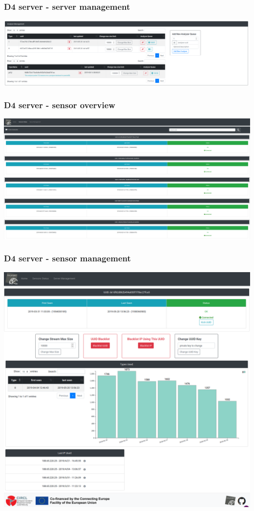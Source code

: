 \documentclass{beamer}
\begin{document}
\begin{frame}
        \frametitle{D4 server - server management}
        \includegraphics[width=\textwidth]{./d4-3.png}
\end{frame}

\begin{frame}
        \frametitle{D4 server - sensor overview}
        \includegraphics[width=\textwidth]{./d4-1.png}
\end{frame}


\begin{frame}
        \frametitle{D4 server - sensor management}
        \includegraphics[width=\textwidth]{./d4-4.png}
\end{frame}
\end{document}
